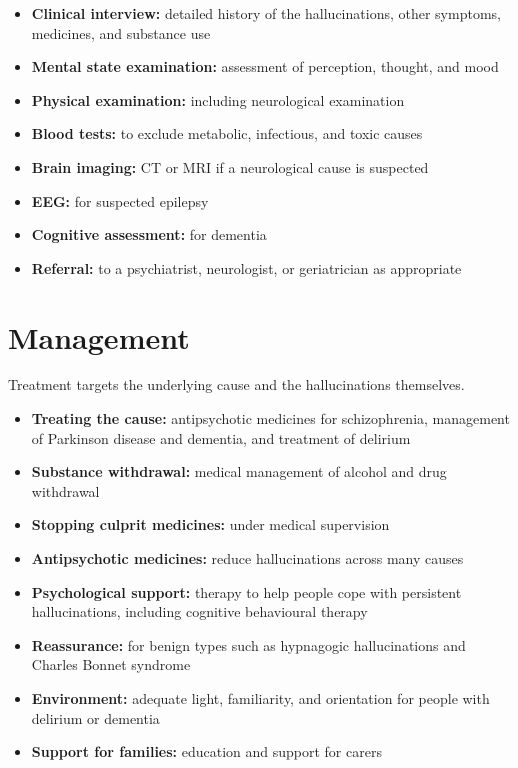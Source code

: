 \begin{itemize}
    \item \textbf{Clinical interview:} detailed history of the hallucinations, other symptoms, medicines, and substance use
    \item \textbf{Mental state examination:} assessment of perception, thought, and mood
    \item \textbf{Physical examination:} including neurological examination
    \item \textbf{Blood tests:} to exclude metabolic, infectious, and toxic causes
    \item \textbf{Brain imaging:} CT or MRI if a neurological cause is suspected
    \item \textbf{EEG:} for suspected epilepsy
    \item \textbf{Cognitive assessment:} for dementia
    \item \textbf{Referral:} to a psychiatrist, neurologist, or geriatrician as appropriate
\end{itemize}

\section*{Management}
Treatment targets the underlying cause and the hallucinations themselves.

\begin{itemize}
    \item \textbf{Treating the cause:} antipsychotic medicines for schizophrenia, management of Parkinson disease and dementia, and treatment of delirium
    \item \textbf{Substance withdrawal:} medical management of alcohol and drug withdrawal
    \item \textbf{Stopping culprit medicines:} under medical supervision
    \item \textbf{Antipsychotic medicines:} reduce hallucinations across many causes
    \item \textbf{Psychological support:} therapy to help people cope with persistent hallucinations, including cognitive behavioural therapy
    \item \textbf{Reassurance:} for benign types such as hypnagogic hallucinations and Charles Bonnet syndrome
    \item \textbf{Environment:} adequate light, familiarity, and orientation for people with delirium or dementia
    \item \textbf{Support for families:} education and support for carers
\end{itemize}

